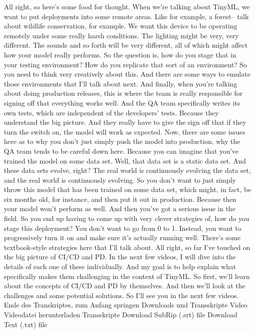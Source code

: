 {{{    All right, so here's some food for thought.
    When we're talking about TinyML, we want to put deployments
    into some remote areas.
    Like for example, a forest--
    talk about wildlife conservation, for example.
    We want this device to be operating remotely
    under some really harsh conditions.
    The lighting might be very, very different.
    The sounds and so forth will be very different, all of which
    might affect how your model really performs.
    So the question is, how do you stage that in your testing environment?
    How do you replicate that sort of an environment?
    So you need to think very creatively about this.
    And there are some ways to emulate those environments that I'll talk about next.
    And finally, when you're talking about doing production releases,
    this is where the team is really responsible for signing off
    that everything works well.
    And the QA team specifically writes its own tests,
    which are independent of the developers' tests.
    Because they understand the big picture.
    And they really have to give the sign off that if they turn the switch on,
    the model will work as expected.
    Now, there are some issues here as to why you don't just
    simply push the model into production, why the QA
    team tends to be careful down here.
    Because you can imagine that you've trained the model on some data set.
    Well, that data set is a static data set.
    And these data sets evolve, right?
    The real world is continuously evolving the data set,
    and the real world is continuously evolving.
    So you don't want to just simply throw this model that
    has been trained on some data set, which might, in fact, be six months old,
    for instance, and then put it out in production.
    Because then your model won't perform as well.
    And then you've got a serious issue in the field.
    So you end up having to come up with very clever strategies of,
    how do you stage this deployment?
    You don't want to go from 0 to 1.
    Instead, you want to progressively turn it on and make
    sure it's actually running well.
    There's some textbook-style strategies here that I'll talk about.
    All right, so far I've touched on the big picture of CI/CD and PD.
    In the next few videos, I will dive into the details
    of each one of these individually.
    And my goal is to help explain what specifically makes them
    challenging in the context of TinyML.
    So first, we'll learn about the concepts of CI/CD and PD by themselves.
    And then we'll look at the challenges and some potential solutions.
    So I'll see you in the next few videos.
    Ende des Transkriptes, zum Anfang springen
    Downloads und Transskripte
    Video
    Videodatei herunterladen
    Transskripte
    Download SubRip (.srt) file
    Download Text (.txt) file    

}}}
